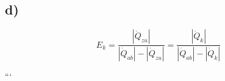 

\subsection*{d)}

\[
E_k = \frac{|\dot{Q}_{zu}|}{|\dot{Q}_{ab}| - |\dot{Q}_{zu}|} = \frac{|\dot{Q}_k|}{|\dot{Q}_{ab}| - |\dot{Q}_k|}
\]

```